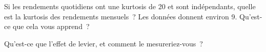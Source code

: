 \begin{interviewq}\label{iq:rs:stylised-facts-of-returns:5}
Si les rendements quotidiens ont une kurtosis de 20 et sont indépendants, quelle est la kurtosis des rendements mensuels~? Les données donnent environ 9. Qu'est-ce que cela
vous apprend~?
\end{interviewq}

\begin{interviewq}\label{iq:rs:stylised-facts-of-returns:6}
Qu'est-ce que l'effet de levier, et comment le mesureriez-vous~?
\end{interviewq}
